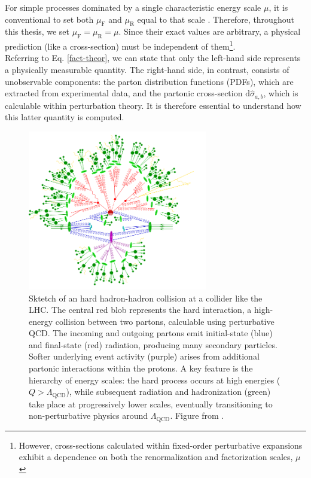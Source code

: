 \documentclass[a4paper, 12pt]{book}
\begin{document}
For simple processes dominated by a single characteristic energy scale $\mu$, it is conventional to set both $\mu_\text{F}$ and $\mu_\text{R}$ equal to that scale \cite{Campbell:2017}. Therefore, throughout this thesis, we set $\mu_\text{F} = \mu_\text{R} = \mu$. Since their exact values are arbitrary, a physical prediction (like a cross-section) must be independent of them\footnote{However, cross-sections calculated within fixed-order perturbative expansions exhibit a dependence on both the renormalization and factorization scales, $\mu$}.  \\
Referring to Eq. \ref{fact-theor}, we can state that only the left-hand side represents a physically measurable quantity. The right-hand side, in contrast, consists of unobservable components: the parton distribution functions (PDFs), which are extracted from experimental data, and the partonic cross-section $\mathrm{d}\hat{\sigma}_{a,b}$, which is calculable within perturbation theory. It is therefore essential to understand how this latter quantity is computed.

\begin{figure}[!ht]
	\centering
	\includegraphics[width=0.7\textwidth]{imgs/hadron-collision.png}
	\caption{Sktetch of an hard hadron-hadron collision at a collider like the LHC. The central red blob represents the hard interaction, a high-energy collision between two partons, calculable using perturbative QCD. The incoming and outgoing partons emit initial-state (blue) and final-state (red) radiation, producing many secondary particles. Softer underlying event activity (purple) arises from additional partonic interactions within the protons. A key feature is the hierarchy of energy scales: the hard process occurs at high energies ($Q>\Lambda_{\text{QCD}}$), while subsequent radiation and hadronization (green) take place at progressively lower scales, eventually transitioning to non-perturbative physics around $\Lambda_{\text{QCD}}$. Figure from \cite{Hoeche:2014}.}
	\label{hadron-collision}
\end{figure}
\end{document}
